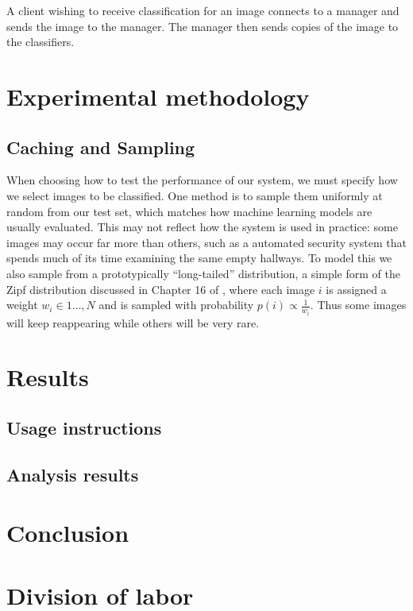 \documentclass[12pt]{article}
\begin{document}
A client wishing to receive classification for an image connects to a manager and sends the image to the manager. The manager then sends copies of the image to the classifiers.




\section{Experimental methodology}

\subsection{Caching and Sampling}

When choosing how to test the performance of our system, we must specify how we select images to be classified.
One method is to sample them uniformly at random from our test set, which matches how machine learning models are usually evaluated.
This may not reflect how the system is used in practice: some images may occur far more than others, such as a automated security system that spends much of its time examining the same empty hallways.
To model this we also sample from a prototypically ``long-tailed'' distribution, a simple form of the Zipf distribution discussed in Chapter 16 of \cite{mitzenmacher}, where each image $i$ is assigned a weight $w_i\in 1\ldots, N$
    and is sampled with probability $p(i)\propto \frac{1}{w_i}$.
Thus some images will keep reappearing while others will be very rare.

\section{Results}

\subsection{Usage instructions}
\subsection{Analysis results}

\section{Conclusion}

\section{Division of labor}
\end{document}
